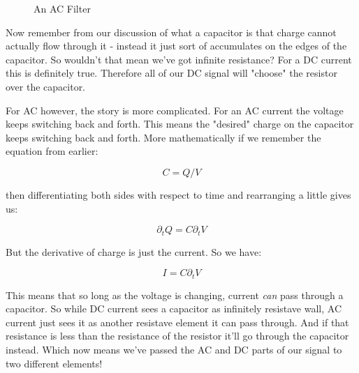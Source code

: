\documentclass[12pt,a6paper]{book}
\begin{document}
\begin{figure}[!htb]
\caption{\label{fig:my-label} An AC Filter}
\end{figure}

Now remember from our discussion of what a capacitor is that charge cannot actually flow through it - instead it just sort of accumulates on the edges of the capacitor. So wouldn't that mean we've got infinite resistance? For a DC current this is definitely true. Therefore all of our DC signal will "choose" the resistor over the capacitor. 

For AC however, the story is more complicated. For an AC current the voltage keeps switching back and forth. This means the "desired" charge on the capacitor keeps switching back and forth. More mathematically if we remember the equation from earlier:

\begin{equation}
C = Q/V
\end{equation}

then differentiating both sides with respect to time and rearranging a little gives us:

\begin{equation}
\partial_t Q = C \partial_t V
\end{equation}

But the derivative of charge is just the current. So we have:

\begin{equation}
I = C \partial_t V
\end{equation}

This means that so long as the voltage is changing, current \textit{can} pass through a capacitor. So while DC current sees a capacitor as infinitely resistave wall, AC current just sees it as another resistave element it can pass through. And if that resistance is less than the resistance of the resistor it'll go through the capacitor instead. Which now means we've passed the AC and DC parts of our signal to two different elements! 
\end{document}
